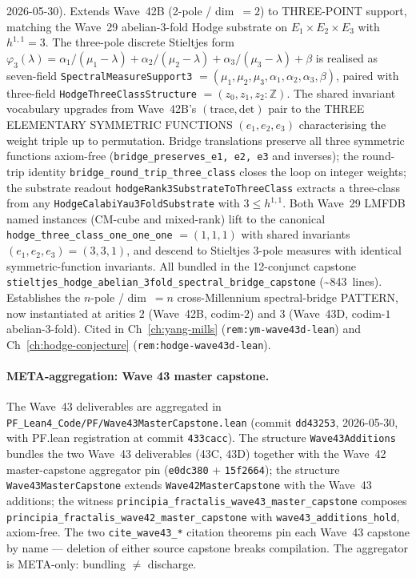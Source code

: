 \begin{itemize}
  2026-05-30). Extends Wave~42B (2-pole / dim~$=2$) to THREE-POINT
  support, matching the Wave~29 abelian-3-fold Hodge substrate on
  $E_1 \times E_2 \times E_3$ with $h^{1,1} = 3$. The three-pole
  discrete Stieltjes form $\varphi_3(\lambda) = \alpha_1/(\mu_1 -
  \lambda) + \alpha_2/(\mu_2 - \lambda) + \alpha_3/(\mu_3 - \lambda) +
  \beta$ is realised as seven-field \texttt{SpectralMeasureSupport3}
  $= (\mu_1, \mu_2, \mu_3, \alpha_1, \alpha_2, \alpha_3, \beta)$,
  paired with three-field \texttt{HodgeThreeClassStructure} $=
  (z_0, z_1, z_2 : \mathbb{Z})$. The shared invariant vocabulary
  upgrades from Wave~42B's $(\mathrm{trace}, \mathrm{det})$ pair to
  the THREE ELEMENTARY SYMMETRIC FUNCTIONS $(e_1, e_2, e_3)$
  characterising the weight triple up to permutation. Bridge
  translations preserve all three symmetric functions axiom-free
  (\texttt{bridge\_preserves\_e1,~e2,~e3} and inverses); the
  round-trip identity \texttt{bridge\_round\_trip\_three\_class}
  closes the loop on integer weights; the substrate readout
  \texttt{hodgeRank3SubstrateToThreeClass} extracts a three-class
  from any \texttt{HodgeCalabiYau3FoldSubstrate} with $3 \leq h^{1,1}$.
  Both Wave~29 LMFDB named instances (CM-cube and mixed-rank) lift
  to the canonical \texttt{hodge\_three\_class\_one\_one\_one} $=
  (1, 1, 1)$ with shared invariants $(e_1, e_2, e_3) = (3, 3, 1)$,
  and descend to Stieltjes 3-pole measures with identical
  symmetric-function invariants. All bundled in the 12-conjunct
  capstone
  \texttt{stieltjes\_hodge\_abelian\_3fold\_spectral\_bridge\_capstone}
  (\textasciitilde 843~lines). Establishes the $n$-pole / dim~$=n$
  cross-Millennium spectral-bridge PATTERN, now instantiated at
  arities $2$ (Wave~42B, codim-$2$) and $3$ (Wave~43D, codim-$1$
  abelian-3-fold). Cited in Ch~\ref{ch:yang-mills}
  (\texttt{rem:ym-wave43d-lean}) and Ch~\ref{ch:hodge-conjecture}
  (\texttt{rem:hodge-wave43d-lean}).
\end{itemize}

\paragraph{META-aggregation: Wave 43 master capstone.} The Wave~43
deliverables are aggregated in
\texttt{PF\_Lean4\_Code/PF/Wave43MasterCapstone.lean} (commit
\texttt{dd43253}, 2026-05-30, with PF.lean registration at commit
\texttt{433cacc}). The structure \texttt{Wave43Additions} bundles
the two Wave~43 deliverables (43C, 43D) together with the Wave~42
master-capstone aggregator pin (\texttt{e0dc380} + \texttt{15f2664});
the structure \texttt{Wave43MasterCapstone} extends
\texttt{Wave42MasterCapstone} with the Wave~43 additions; the witness
\texttt{principia\_fractalis\_wave43\_master\_capstone} composes
\texttt{principia\_fractalis\_wave42\_master\_capstone} with
\texttt{wave43\_additions\_hold}, axiom-free. The two
\texttt{cite\_wave43\_*} citation theorems pin each Wave~43 capstone
by name --- deletion of either source capstone breaks compilation.
The aggregator is META-only: bundling $\neq$ discharge.

